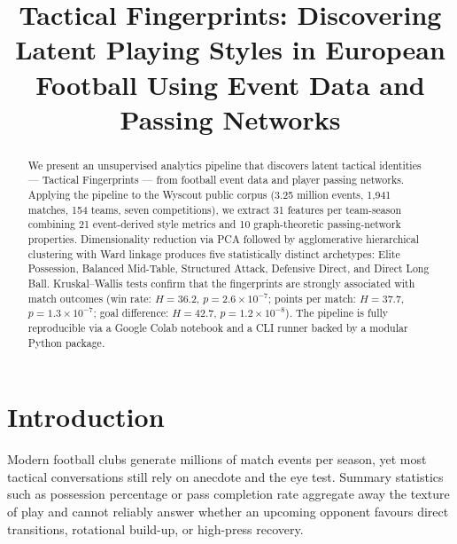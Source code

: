 \documentclass[runningheads]{llncs}
\begin{document}
%
\title{Tactical Fingerprints: Discovering Latent Playing Styles in European Football Using Event Data and Passing Networks}
%
\author{}
%
\authorrunning{}
%
\institute{}
%
\maketitle
%
\begin{abstract}
We present an unsupervised analytics pipeline that discovers latent tactical identities --- Tactical Fingerprints --- from football event data and player passing networks. Applying the pipeline to the Wyscout public corpus (3.25 million events, 1,941 matches, 154 teams, seven competitions), we extract 31 features per team-season combining 21 event-derived style metrics and 10 graph-theoretic passing-network properties. Dimensionality reduction via PCA followed by agglomerative hierarchical clustering with Ward linkage produces five statistically distinct archetypes: Elite Possession, Balanced Mid-Table, Structured Attack, Defensive Direct, and Direct Long Ball. Kruskal--Wallis tests confirm that the fingerprints are strongly associated with match outcomes (win rate: $H = 36.2$, $p = 2.6 \times 10^{-7}$; points per match: $H = 37.7$, $p = 1.3 \times 10^{-7}$; goal difference: $H = 42.7$, $p = 1.2 \times 10^{-8}$). The pipeline is fully reproducible via a Google Colab notebook and a CLI runner backed by a modular Python package.

\end{abstract}
%
%
%
\section{Introduction}

Modern football clubs generate millions of match events per season, yet most tactical conversations still rely on anecdote and the eye test. Summary statistics such as possession percentage or pass completion rate aggregate away the texture of play and cannot reliably answer whether an upcoming opponent favours direct transitions, rotational build-up, or high-press recovery.
\end{document}
